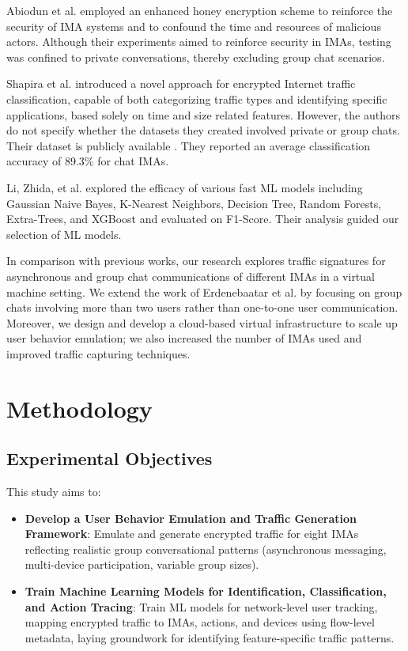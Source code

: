 \documentclass[conference]{IEEEtran}
\begin{document}
Abiodun et al. \cite{b4} employed an enhanced honey encryption scheme to reinforce the security of IMA systems and to confound the time and resources of malicious actors. Although their experiments aimed to reinforce security in IMAs, testing was confined to private conversations, thereby excluding group chat scenarios. 

Shapira et al. \cite{b8} introduced a novel approach for encrypted Internet traffic classification, capable of both categorizing traffic types and identifying specific applications, based solely on time and size related features. However, the authors do not specify whether the datasets they created involved private or group chats. Their dataset is publicly available \cite{b13}. They reported an average classification accuracy of 89.3\% for chat IMAs.

Li, Zhida, et al. \cite{b16} explored the efficacy of various fast ML models including Gaussian Naive Bayes, K-Nearest Neighbors, Decision Tree, Random Forests, Extra-Trees, and XGBoost and evaluated on F1-Score. Their analysis guided our selection of ML models.


In comparison with previous works, our research explores traffic signatures for asynchronous and group chat communications of different IMAs in a virtual machine setting. We extend the work of Erdenebaatar et al.\cite{b1} by focusing on group chats involving more than two users rather than one-to-one user communication. Moreover, we design and develop a cloud-based virtual infrastructure to scale up user behavior emulation; we also increased the number of IMAs used and improved traffic capturing techniques. 

\section{Methodology}
\subsection{Experimental Objectives}
This study aims to:

\begin{itemize}
    \item \textbf{Develop a User Behavior Emulation and Traffic Generation Framework}: Emulate and generate encrypted traffic for eight IMAs reflecting realistic group conversational patterns (asynchronous messaging, multi-device participation, variable group sizes).
    \item \textbf{Train Machine Learning Models for Identification, Classification, and Action Tracing}: Train ML models for network-level user tracking, mapping encrypted traffic to IMAs, actions, and devices using flow-level metadata, laying groundwork for identifying feature-specific traffic patterns.
\end{itemize}
\end{document}
